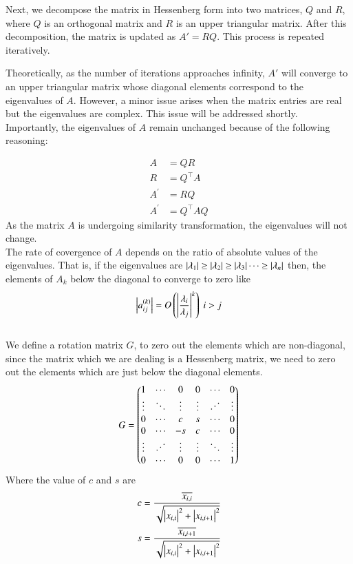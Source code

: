 \documentclass[journal]{IEEEtran}
\begin{document}
Next, we decompose the matrix in Hessenberg form into two matrices, $Q$ and $R$, where $Q$ is an orthogonal matrix and $R$ is an upper triangular matrix. After this decomposition, the matrix is updated as $A' = RQ$. This process is repeated iteratively. 

Theoretically, as the number of iterations approaches infinity, $A'$ will converge to an upper triangular matrix whose diagonal elements correspond to the eigenvalues of $A$. However, a minor issue arises when the matrix entries are real but the eigenvalues are complex. This issue will be addressed shortly. Importantly, the eigenvalues of $A$ remain unchanged because of the following reasoning:

\begin{align}
	A &= QR\\
	R &= Q^\top A\\
	A^\prime &= RQ\\
	A^\prime &= Q^\top AQ
\end{align}
As the matrix $A$ is undergoing similarity transformation, the eigenvalues will not change.\\
The rate of covergence of $A$ depends on the ratio of absolute values of the eigenvalues. That is, if the eigenvalues are $\left\vert\lambda_1\right\vert \geq \left\vert\lambda_2\right\vert \geq \left\vert\lambda_3\right\vert \dots \geq \left\vert\lambda_n\right\vert$ then, the elements of $A_k$ below the diagonal to converge to zero like
\begin{align}
    \left\vert a_{ij}^{\left(k\right)}\right\vert = O\left(\left\vert\frac{\lambda_i}{\lambda_j}\right\vert^k\right)\text{    } i > j
\end{align}
\\
We define a rotation matrix $G$, to zero out the elements which are non-diagonal, since the matrix which we are dealing is a Hessenberg matrix, we need to zero out the elements which are just below the diagonal elements.
\begin{align}
G = \myvec{
1 & \cdots & 0 & 0 & \cdots & 0 \\
\vdots & \ddots & \vdots & \vdots & \reflectbox{$\ddots$} & \vdots \\
0 & \cdots & c & s & \cdots & 0\\
0 & \cdots & -s & c & \cdots & 0\\
\vdots & \reflectbox{$\ddots$} & \vdots & \vdots & \ddots & \vdots\\
0 & \cdots & 0 & 0 & \cdots & 1
}
\end{align}
Where the value of $c$ and $s$ are
\begin{align}
	c = \frac{\overline{x_{i,i}}}{\sqrt{\left\vert x_{i,i}\right\vert^2+\left\vert x_{i,i+1}\right\vert^2}}\\
	s = \frac{\overline{x_{i,i+1}}}{\sqrt{\left\vert x_{i,i}\right\vert^2+\left\vert x_{i,i+1}\right\vert^2}}
\end{align}
\end{document}
